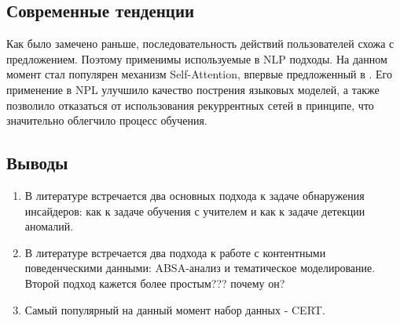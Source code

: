\subsection{Современные тенденции}

Как было замечено раньше, последовательность действий пользователей схожа с предложением. Поэтому применимы используемые в NLP подходы. На данном момент стал популярен механизм Self-Attention, впервые предложенный в \cite{vaswani2017attention}. Его применение в NPL улучшило качество пострения языковых моделей, а также позволило отказаться от использования рекуррентных сетей в принципе, что значительно облегчило процесс обучения.

\subsection{Выводы}
\begin{enumerate}
\item В литературе встречается два основных подхода к задаче обнаружения инсайдеров: как к задаче обучения с учителем и как к задаче детекции аномалий. 
\item В литературе встречается два подхода к работе с контентными поведенческими данными: ABSA-анализ и тематическое моделирование. Второй подход кажется более простым??? почему он?
\item Самый популярный на данный момент набор данных - CERT. 
\end{enumerate}

\label{sec:sample}
\clearpage
